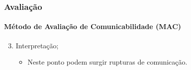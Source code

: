 \documentclass[14pt,beamer]{beamer}
\begin{document}
\begin{frame}
	\frametitle{Avaliação}
	\framesubtitle{Método de Avaliação de Comunicabilidade (MAC)}

	\begin{enumerate} \setcounter{enumi}{2}
        \item Interpretação;
            \begin{itemize}
                \item Neste ponto podem surgir rupturas de comunicação.
            \end{itemize}
	\end{enumerate}


\end{frame}
\end{document}
